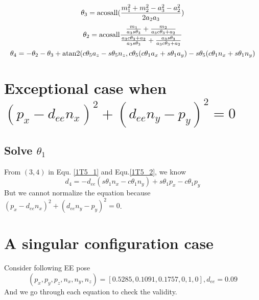 \documentclass[utf8]{article}
\begin{document}
\begin{equation*}
\theta_3 = {\rm acosall}(\frac{m_1^2 + m_2^2 - a_3^2 - a_2^2}{2a_2a_3})
\end{equation*}
\begin{equation*}
\theta_2 = {\rm acosall}\frac{\frac{m_1}{a_3s\theta_3} +\frac{m_2}{a_3c\theta_3 +a_2}}{\frac{a_3c\theta_3+a_2}{a_3s\theta_3} + \frac{a_3s\theta_3}{a_3c\theta_3 + a_2}}
\end{equation*}
\begin{equation*}
\theta_4 = -\theta_2 - \theta_3 + {\rm atan2}(c\theta_5a_z - s\theta_5n_z, c\theta_5(c\theta_1a_x +s\theta_1a_y) - s\theta_5(c\theta_1n_x + s\theta_1n_y)
\end{equation*}

\section{Exceptional case when $(p_x - d_{ee}n_x)^2 + (d_{ee}n_y - p_y)^2 = 0$}
\subsection{Solve $\theta_1$}
From $(3, 4)$ in Equ. \ref{1T5_1} and Equ.\ref{1T5_2}, we know
$$d_4 = -d_{ee}(s\theta_1n_x - c\theta_1n_y) + s\theta_1p_x - c\theta_1p_y$$
But we cannot normalize the equation because $(p_x - d_{ee}n_x)^2 + (d_{ee}n_y - p_y)^2 = 0$. 

\section{A singular configuration case}
Consider following EE pose 
\begin{equation}
(p_x, p_y, p_z, n_x, n_y, n_z) = [0.5285, 0.1091, 0.1757, 0, 1, 0], d_{ee} = 0.09
\end{equation}
And we go through each equation to check the validity. 





\end{document}
